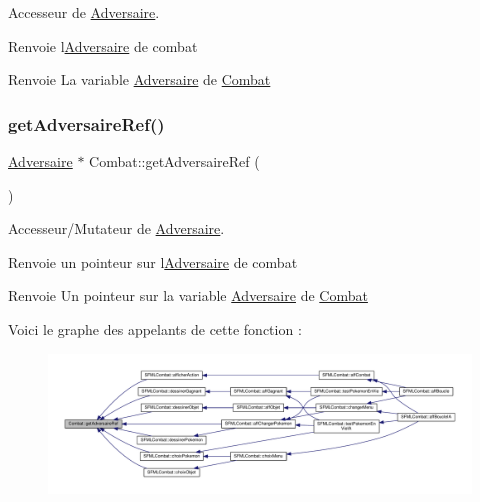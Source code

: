 Accesseur de \hyperlink{class_adversaire}{Adversaire}. 

Renvoie l\textquotesingle{}\hyperlink{class_adversaire}{Adversaire} de combat \begin{DoxyReturn}{Renvoie}
La variable \hyperlink{class_adversaire}{Adversaire} de \hyperlink{class_combat}{Combat} 
\end{DoxyReturn}
\mbox{\label{class_combat_a59088f5725884e9c363ad72a946c82ef}} 
\subsubsection{\texorpdfstring{get\+Adversaire\+Ref()}{getAdversaireRef()}}
{\footnotesize\ttfamily \hyperlink{class_adversaire}{Adversaire} $\ast$ Combat\+::get\+Adversaire\+Ref (\begin{DoxyParamCaption}{ }\end{DoxyParamCaption})}



Accesseur/\+Mutateur de \hyperlink{class_adversaire}{Adversaire}. 

Renvoie un pointeur sur l\textquotesingle{}\hyperlink{class_adversaire}{Adversaire} de combat \begin{DoxyReturn}{Renvoie}
Un pointeur sur la variable \hyperlink{class_adversaire}{Adversaire} de \hyperlink{class_combat}{Combat} 
\end{DoxyReturn}
Voici le graphe des appelants de cette fonction \+:\nopagebreak
\begin{figure}[H]
\begin{center}
\leavevmode
\includegraphics[width=350pt]{class_combat_a59088f5725884e9c363ad72a946c82ef_icgraph}
\end{center}
\end{figure}
\mbox{\label{class_combat_a3784ddbca993b5ad0fb0d4dd382f919a}} 
